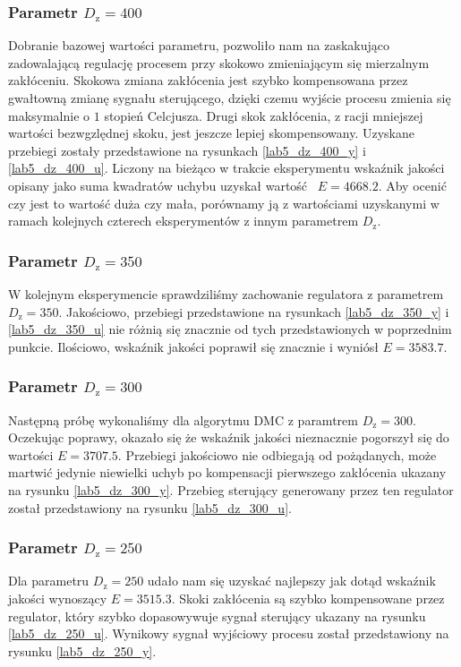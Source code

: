 \subsubsection{Parametr $D_{\mathrm{z}} = \num{400}$}
Dobranie bazowej wartości parametru, pozwoliło nam na zaskakująco
zadowalającą regulację procesem przy skokowo zmieniającym się 
mierzalnym zakłóceniu. Skokowa zmiana zakłócenia jest szybko kompensowana 
przez gwałtowną zmianę sygnału sterującego, dzięki czemu wyjście procesu zmienia się
maksymalnie o $\num{1}$ stopień Celcjusza. Drugi skok zakłócenia, z racji mniejszej 
wartości bezwgzlędnej skoku, jest jeszcze lepiej skompensowany. Uzyskane przebiegi zostały przedstawione
na rysunkach \ref{lab5_dz_400_y} i \ref{lab5_dz_400_u}. Liczony na bieżąco w trakcie 
eksperymentu wskaźnik jakości opisany jako suma kwadratów uchybu uzyskał wartość 
$E = \num{4668.2}$. Aby ocenić czy jest to wartość duża czy mała, porównamy ją z wartościami
uzyskanymi w ramach kolejnych czterech eksperymentów z innym parametrem $D_{\mathrm{z}}$.


\subsubsection{Parametr $D_{\mathrm{z}} = \num{350}$}
W kolejnym eksperymencie sprawdziliśmy zachowanie regulatora z parametrem $D_{\mathrm{z}} = \num{350}$.
Jakościowo, przebiegi przedstawione na rysunkach \ref{lab5_dz_350_y} i \ref{lab5_dz_350_u} nie różnią
się znacznie od tych przedstawionych w poprzednim punkcie. Ilościowo, wskaźnik jakości poprawił się 
znacznie i wyniósł $E = \num{3583.7}$. 


\subsubsection{Parametr $D_{\mathrm{z}} = \num{300}$}
Następną próbę wykonaliśmy dla algorytmu DMC z paramtrem $D_{\mathrm{z}} = \num{300}$. Oczekując
poprawy, okazało się że wskaźnik jakości nieznacznie pogorszył się do wartości 
$E = \num{3707.5}$. Przebiegi jakościowo nie odbiegają od pożądanych, może martwić jedynie 
niewielki uchyb po kompensacji pierwszego zakłócenia ukazany na rysunku \ref{lab5_dz_300_y}. Przebieg
sterujący generowany przez ten regulator został przedstawiony na rysunku \ref{lab5_dz_300_u}.

\subsubsection{Parametr $D_{\mathrm{z}} = \num{250}$}
Dla parametru $D_{\mathrm{z}} = \num{250}$ udało nam się uzyskać najlepszy jak dotąd wskaźnik jakości
wynoszący $E = \num{3515.3}$. Skoki zakłócenia są szybko kompensowane przez regulator, który szybko
dopasowywuje sygnał sterujący ukazany na rysunku \ref{lab5_dz_250_u}. Wynikowy sygnał wyjściowy procesu
został przedstawiony na rysunku \ref{lab5_dz_250_y}.

